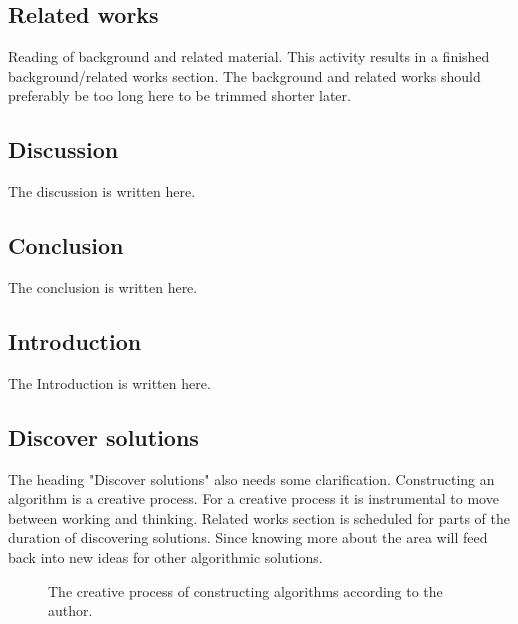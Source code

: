 \documentclass[msc,lith,english]{liuthesis}
\begin{document}
\subsection{Related works}
Reading of background and related material. This activity results in a finished background/related works section.
The background and related works should preferably be too long here to be trimmed shorter later.

\subsection{Discussion}
The discussion is written here.

\subsection{Conclusion}
The conclusion is written here.

\subsection{Introduction}
The Introduction is written here.

\subsection{Discover solutions}
The heading "Discover solutions" also needs some clarification. Constructing
an algorithm is a creative process. For a creative process it is instrumental
to move between working and thinking. Related works section is scheduled for
parts of the duration of discovering solutions. Since knowing more about the
area will feed back into new ideas for other algorithmic solutions. 

\begin{center}
\begin{figure}[h]
\centering
{}
\caption{The creative process of constructing algorithms according to the author.}
\label{figCreativeProcess}
\end{figure}
\end{center}
\end{document}
